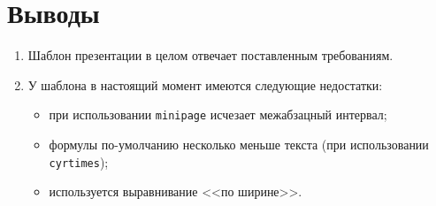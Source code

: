 \documentclass[12pt]{article}
\begin{document}
\section{Выводы}

\begin{enumerate}
\item Шаблон презентации в целом отвечает поставленным требованиям.

\item У шаблона в настоящий момент имеются следующие недостатки:
\begin{itemize}
\item при использовании \verb+minipage+ исчезает межабзацный интервал;
\item формулы по-умолчанию несколько меньше текста (при использовании \texttt{cyrtimes});
\item используется выравнивание <<по ширине>>.
\end{itemize}

\end{enumerate}
\end{document}
